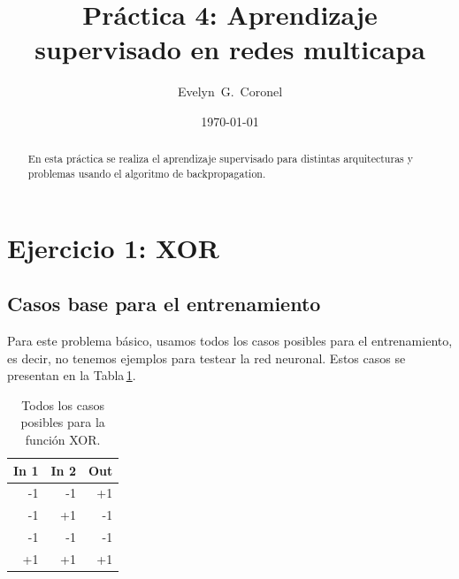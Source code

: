 



\title{Práctica 4: Aprendizaje supervisado en redes multicapa}
\author{Evelyn~G.~Coronel}


\date[]{\lowercase{\today}} %

\begin{abstract}
En esta práctica se realiza el aprendizaje supervisado para distintas arquitecturas y problemas usando el algoritmo de backpropagation.
\end{abstract} 
\maketitle
%

\section*{Ejercicio 1: XOR}

\subsection*{Casos base para el entrenamiento}

Para este problema básico, usamos todos los casos posibles para el entrenamiento, es decir, no tenemos ejemplos para testear la red neuronal. Estos casos se presentan en la Tabla\,\ref{tab:xor}.

\begin{table}[H]
\centering
\begin{tabular}{r r | r}
In 1 & In 2 & Out 	\\ \hline
-1 		  &-1	& +1 \\
-1 		  &+1	& -1\\
-1 		  &-1	& -1\\
+1 		  &+1	& +1\\
\end{tabular}
\caption{Todos los casos posibles para la función XOR.} \label{tab:xor}
\end{table}

